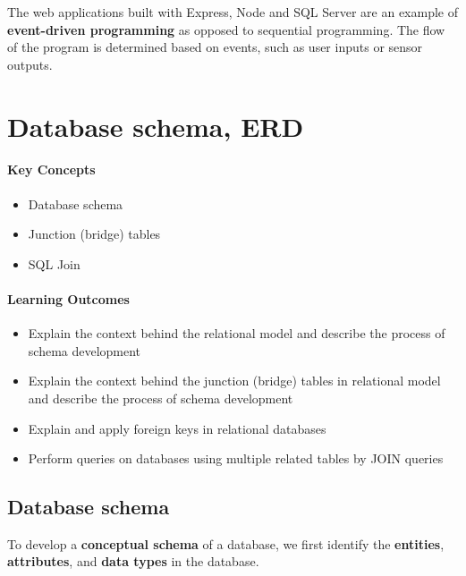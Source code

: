 The web applications built with Express, Node and SQL Server are an example of \textbf{event-driven programming} as opposed to sequential programming.  The flow of the program is determined based on events, such as user inputs or sensor outputs.

\section{Database schema, ERD}



\begin{mdframed}

\paragraph{Key Concepts}
\begin{itemize}[label={\checkmark}]
\item Database schema
\item Junction (bridge) tables
\item SQL Join
\end{itemize}

\paragraph{Learning Outcomes}
\begin{itemize}[label={\checkmark}]
\item Explain the context behind the relational model and describe the process of schema development
\item Explain the context behind the junction (bridge) tables in relational model and describe the process of schema development
\item Explain and apply foreign keys in relational databases
\item Perform queries on databases using multiple related tables by JOIN queries
\end{itemize}
\end{mdframed}




\subsection{Database schema}

To develop a \textbf{conceptual schema} of a database, we first identify the \textbf{entities}, \textbf{attributes}, and \textbf{data types} in the database.

